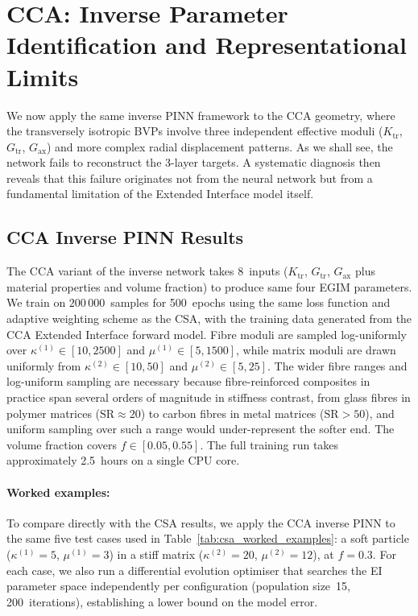 \documentclass[oneside, 12pt, a4paper, bibliography=totoc]{book}
\begin{document}
\section{CCA: Inverse Parameter Identification and Representational Limits}
\label{sec:cca_results}

We now apply the same inverse PINN framework to the CCA geometry, where the transversely isotropic BVPs involve three independent effective moduli ($K_{\text{tr}}$, $G_{\text{tr}}$, $G_{\text{ax}}$) and more complex radial displacement patterns. As we shall see, the network fails to reconstruct the 3-layer targets. A systematic diagnosis then reveals that this failure originates not from the neural network but from a fundamental limitation of the Extended Interface model itself.

\subsection{CCA Inverse PINN Results}
\label{subsec:cca_pinn_results}
\label{subsec:cca_pinn_implications}

The CCA variant of the inverse network takes 8~inputs ($K_{\text{tr}}$, $G_{\text{tr}}$, $G_{\text{ax}}$ plus material properties and volume fraction) to produce same four EGIM parameters. We train on $200\,000$~samples for 500~epochs using the same loss function and adaptive weighting scheme as the CSA, with the training data generated from the CCA Extended Interface forward model. Fibre moduli are sampled log-uniformly over $\kappa^{(1)} \in [10, 2500]$ and $\mu^{(1)} \in [5, 1500]$, while matrix moduli are drawn uniformly from $\kappa^{(2)} \in [10, 50]$ and $\mu^{(2)} \in [5, 25]$. The wider fibre ranges and log-uniform sampling are necessary because fibre-reinforced composites in practice span several orders of magnitude in stiffness contrast, from glass fibres in polymer matrices ($\text{SR} \approx 20$) to carbon fibres in metal matrices ($\text{SR} > 50$), and uniform sampling over such a range would under-represent the softer end. The volume fraction covers $f \in [0.05, 0.55]$. The full training run takes approximately 2.5~hours on a single CPU core.

\paragraph{Worked examples:}
To compare directly with the CSA results, we apply the CCA inverse PINN to the same five test cases used in Table~\ref{tab:csa_worked_examples}: a soft particle ($\kappa^{(1)} = 5$, $\mu^{(1)} = 3$) in a stiff matrix ($\kappa^{(2)} = 20$, $\mu^{(2)} = 12$), at $f = 0.3$. For each case, we also run a differential evolution optimiser that searches the EI parameter space independently per configuration (population size~15, 200~iterations), establishing a lower bound on the model error.
\end{document}
